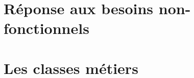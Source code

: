 \section{Réponse aux besoins non-fonctionnels}



\section{Les classes métiers}
\label{section_metiers}

